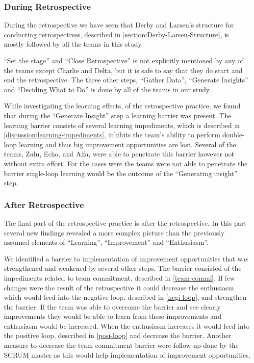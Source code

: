 \subsubsection{During Retrospective}
During the retrospective we have seen that Derby and Larsen's \cite{Larsen2006} structure for conducting retrospectives, described in \autoref{section:Derby-Larsen-Structure}, is mostly followed by all the teams in this study. 

``Set the stage'' and ``Close Retrospective'' is not explicitly mentioned by any of the teams except Charlie and Delta, but it is safe to say that they do start and end the retrospective. The three other steps, ``Gather Data'', ``Generate Insights'' and ``Deciding What to Do'' is done by all of the teams in our study. 

While investigating the learning effects, of the retrospective practice, we found that during the ``Generate Insight'' step a learning barrier was present. The learning barrier consists of several learning impediments, which is described in \autoref{discussion:learning-impediments}, inhibits the team's ability to perform double-loop learning and thus big improvement opportunities are lost. Several of the teams, Zulu, Echo, and Alfa, were able to penetrate this barrier however not without extra effort. For the cases were the teams were not able to penetrate the barrier single-loop learning would be the outcome of the ``Generating insight'' step.

\subsubsection{After Retrospective}
The final part of the retrospective practice is after the retrospective. In this part several new findings revealed a more complex picture than the previously assumed elements of ``Learning'', ``Improvement'' and ``Enthusiasm''.

We identified a barrier to implementation of improvement opportunities that was strengthened and weakened by several other steps. The barrier consisted of the impediments related to team commitment, described in \autoref{team-commi}. If few changes were the result of the retrospective it could decrease the enthusiasm which would feed into the negative loop, described in \autoref{negi-loop}, and strengthen the barrier. If the team was able to overcome the barrier and see clearly improvements they would be able to learn from these improvements and enthusiasm would be increased. When the enthusiasm increases it would feed into the positive loop, described in \autoref{posi-loop} and decrease the barrier. Another measure to decrease the team commitment barrier were follow-up done by the SCRUM master as this would help implementation of improvement opportunities. 

